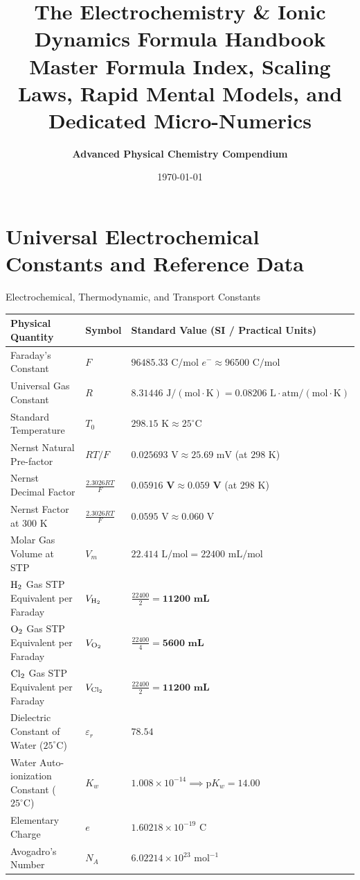 \documentclass[11pt,a4paper]{report}
\title{\Huge\textbf{The Electrochemistry \& Ionic Dynamics Formula Handbook}\\
\Large Master Formula Index, Scaling Laws, Rapid Mental Models, and Dedicated Micro-Numerics}
\author{\textbf{Advanced Physical Chemistry Compendium}}
\date{\today}
\begin{document}
\maketitle
\tableofcontents

\chapter{Universal Electrochemical Constants and Reference Data}

\begin{databox}{Electrochemical, Thermodynamic, and Transport Constants}
\centering
\begin{tabular}{lll}
\toprule
\textbf{Physical Quantity} & \textbf{Symbol} & \textbf{Standard Value (SI / Practical Units)} \\
\midrule
Faraday's Constant & $F$ & $96485.33\text{ C/mol } e^- \approx 96500\text{ C/mol}$ \\
Universal Gas Constant & $R$ & $8.31446\text{ J}/(\text{mol}\cdot\text{K}) = 0.08206\text{ L}\cdot\text{atm}/(\text{mol}\cdot\text{K})$ \\
Standard Temperature & $T_0$ & $298.15\text{ K} \approx 25^\circ\text{C}$ \\
Nernst Natural Pre-factor & $RT/F$ & $0.025693\text{ V} \approx 25.69\text{ mV}$ (at $298\text{ K}$) \\
Nernst Decimal Factor & $\frac{2.3026 RT}{F}$ & $\bm{0.05916\text{ V}} \approx \bm{0.059\text{ V}}$ (at $298\text{ K}$) \\
Nernst Factor at $300\text{ K}$ & $\frac{2.3026 RT}{F}$ & $0.0595\text{ V} \approx 0.060\text{ V}$ \\
Molar Gas Volume at STP & $V_m$ & $22.414\text{ L/mol} = 22400\text{ mL/mol}$ \\
$\ce{H2}$ Gas STP Equivalent per Faraday & $V_{\ce{H2}}$ & $\frac{22400}{2} = \bm{11200\text{ mL}}$ \\
$\ce{O2}$ Gas STP Equivalent per Faraday & $V_{\ce{O2}}$ & $\frac{22400}{4} = \bm{5600\text{ mL}}$ \\
$\ce{Cl2}$ Gas STP Equivalent per Faraday & $V_{\ce{Cl2}}$ & $\frac{22400}{2} = \bm{11200\text{ mL}}$ \\
Dielectric Constant of Water ($25^\circ\text{C}$) & $\varepsilon_r$ & $78.54$ \\
Water Auto-ionization Constant ($25^\circ\text{C}$) & $K_w$ & $1.008 \times 10^{-14} \implies \mathrm{p}K_w = 14.00$ \\
Elementary Charge & $e$ & $1.60218 \times 10^{-19}\text{ C}$ \\
Avogadro's Number & $N_A$ & $6.02214 \times 10^{23}\text{ mol}^{-1}$ \\
\bottomrule
\end{tabular}
\end{databox}
\end{document}
